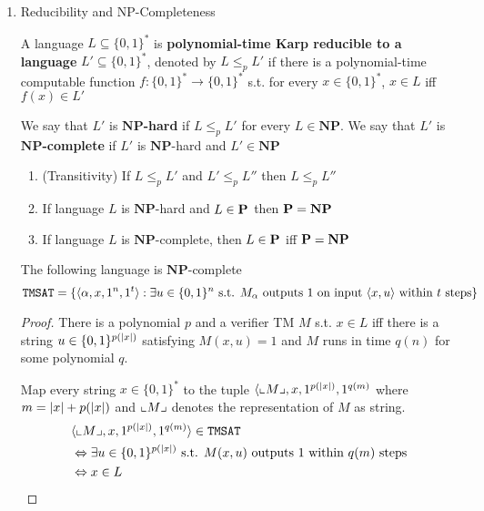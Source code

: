 \documentclass[11pt]{article}
\def \NP {\textbf{NP}}
\def \NP {\textbf{NP}}
\def \TMSAT {\texttt{TMSAT}}
\begin{document}
\begin{enumerate}
\begin{proof}
Conversely, if \(L\in\NP\), then we describe a polynomial time NDTM \(N\) that decides \(L\).
On input \(x\), it uses the ability to make nondeterministic choices to write down a
string \(u\) of length \(p(\abs{x})\). (Having transition \(\delta_0\) correspond to writing a
0 and \(\delta_1\) ). Then it runs the deterministic verifier 
\end{proof}

\item Reducibility and NP-Completeness
\label{sec:org27f5266}
\begin{definition}[]
A language \(L\subseteq\{0,1\}^*\) is \textbf{polynomial-time Karp reducible to a
language} \(L'\subseteq\{0,1\}^*\), denoted by \(L\le_p L'\) if there is a polynomial-time
computable function \(f:\{0,1\}^*\to\{0,1\}^*\) s.t. for every \(x\in\{0,1\}^*\),
\(x\in L\) iff \(f(x)\in L'\)

We say that \(L'\) is \textbf{\(\NP\)-hard} if \(L\le_pL'\) for every \(L\in\NP\). We say that \(L'\)
is \textbf{\(\NP\)-complete} if \(L'\) is \(\NP\)-hard and \(L'\in\NP\)
\end{definition}

\begin{theorem}[]
\begin{enumerate}
\item (Transitivity) If \(L\le_pL'\) and \(L'\le_pL''\) then \(L\le_pL''\)
\item If language \(L\) is \(\NP\)-hard and \(L\in\operatorname{\textbf{P}}\) then \(\bP=\NP\)
\item If language \(L\) is \(\NP\)-complete, then \(L\in\operatorname{\textbf{P}}\) iff \(\bP=\NP\)
\end{enumerate}
\end{theorem}

\begin{theorem}[]
The following language is \(\NP\)-complete
    \begin{equation*}
\TMSAT=\{\la\alpha,x,1^n,1^t\ra:\exists u\in\{0,1\}^n\text{ s.t. }M_\alpha\text{ outputs }1
\text{ on input }\la x,u\ra\text{ within }t\text{ steps}\}
    \end{equation*}
\end{theorem}

\begin{proof}
There is a polynomial \(p\) and a verifier TM \(M\) s.t. \(x\in L\) iff there is a
string \(u\in\{0,1\}^{p(\abs{x})}\) satisfying \(M(x,u)=1\) and \(M\) runs in time \(q(n)\) for
some polynomial \(q\).

Map every string \(x\in\{0,1\}^*\) to the tuple \(\la\lcorner{M},x,1^{p(\abs{x})},1^{q(m)}\)
where \(m=\abs{x}+p(\abs{x})\) and \(\llcorner M \lrcorner\) denotes the representation of \(M\) as
string.
    \begin{align*}
&\la\lcorner{M},x,1^{p(\abs{x})},1^{q(m)}\ra\in\TMSAT\\
&\Leftrightarrow\exists u\in\{0,1\}^{p(\abs{x})}\text{ s.t. }M(x,u)\text{ outputs 1 within }q(m)\text{ steps}\\
&\Leftrightarrow x\in L
    \end{align*}
\end{proof}


\end{enumerate}
\end{document}
